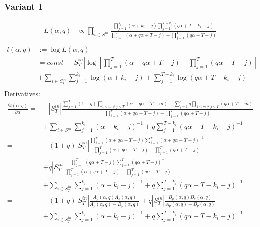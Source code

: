\documentclass[a4paper, 12pt]{article}
\newcommand{\sint}[1][T]{|S^{in}_{#1}|}
\begin{document}
\subsubsection{Variant 1}
\begin{align*}
    L(\alpha, q) &\propto \prod_{i \in S_T^{in}} \frac{\prod_{j=1}^{k_i} (\alpha + k_i - j)\prod_{j=1}^{T - k_i} (q\alpha + T - k_i - j)}{\prod_{j=1}^T(\alpha + q\alpha + T - j) - \prod_{j=1}^T (q\alpha + T - j)} \\
\end{align*}
\begin{align} \label{eq:4}
    l(\alpha, q) &:= \log L(\alpha, q) \nonumber \\
    &= const - |S_T^{in}|\log\left[\prod_{j=1}^T(\alpha + q\alpha + T - j) - \prod_{j=1}^T (q\alpha + T - j)\right] \nonumber \\
    &+ \sum_{i \in S_T^{in}} \sum_{j = 1}^{k_i} \log(\alpha + k_i - j) + \sum_{j = 1}^{T - k_i} \log(q\alpha + T - k_i - j) \nonumber \\
\end{align}
Derivatives:
\begin{align} \label{eq:5}
    \frac{\partial l(\alpha, q)}{\partial \alpha} =& -\sint \frac{\sum_{j = 1}^{T} (1 + q) \prod_{1 \leq m \neq j \leq T} (\alpha + q\alpha + T - m) - \sum_{j = 1}^{T} q \prod_{1 \leq m \neq j \leq T} (q\alpha + T - m)}{\prod_{j = 1}^{T} (\alpha + q\alpha + T - j) - \prod_{j=1}^T (q\alpha + T - j)}\nonumber \\
    &+ \sum_{i \in S_T^{in}} \sum_{j = 1}^{k_i} (\alpha + k_i - j)^{-1} + q\sum_{j = 1}^{T - k_i} (q\alpha + T - k_i - j)^{-1} \nonumber \\
    =& -(1 + q)\sint \frac{ \prod_{j = 1}^{T} (\alpha + q\alpha + T - j) \sum_{j = 1}^{T} (\alpha + q\alpha + T - j)^{-1} }{\prod_{j = 1}^{T} (\alpha + q\alpha + T - j) - \prod_{j=1}^T (q\alpha + T - j)} \nonumber \\
    &+ q|S_T^{in}| \frac{\prod_{j = 1}^{T} (q\alpha + T - j) \sum_{j = 1}^{T} (q\alpha + T - j)^{-1}  }{ \prod_{j = 1}^{T} (\alpha + q\alpha + T - j) - \prod_{j=1}^T (q\alpha + T - j)} \nonumber \\
    &+ \sum_{i \in S_T^{in}} \sum_{j = 1}^{k_i} (\alpha + k_i - j)^{-1} + q\sum_{j = 1}^{T - k_i} (q\alpha + T - k_i - j)^{-1} \nonumber \\
    =& -(1 + q)\sint \frac{ A_p(\alpha, q) A_s(\alpha, q) }{A_p(\alpha, q) - B_p(\alpha, q)} + q|S_T^{in}| \frac{B_p(\alpha, q) B_s(\alpha, q)  }{ A_p(\alpha, q) - B_p(\alpha, q)} \nonumber \\
    &+ \sum_{i \in S_T^{in}} \sum_{j = 1}^{k_i} (\alpha + k_i - j)^{-1} + q\sum_{j = 1}^{T - k_i} (q\alpha + T - k_i - j)^{-1} \nonumber \\
\end{align}
\end{document}
